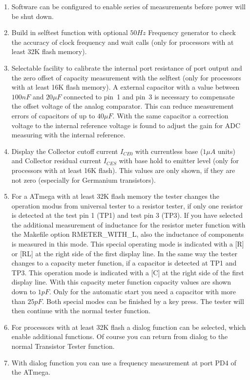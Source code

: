 \begin{enumerate}
\item Software can be configured to enable series of measurements before power will be shut down.
\item Build in selftest function with optional \(50Hz\) Frequency generator to check the accuracy of clock frequency and wait calls (only for processors with at least 32K flash memory).
\item Selectable facility to calibrate the internal port resistance of port output and
the zero offset of capacity measurement with the selftest (only for processors with at least 16K flash memory).
A external capacitor with a value between \(100nF\) 
and \(20\mu F\) connected to pin~1 and pin~3 is necessary to compensate the offset voltage of the analog comparator.
This can reduce measurement errors of capacitors of up to \(40\mu F\).
With the same capacitor a correction voltage to the internal reference voltage is found to adjust the
gain for ADC measuring with the internal reference.
\item Display the Collector cutoff current \(I_{CE0}\) with currentless base (\(1\mu A\) units) and
Collector residual current \(I_{CES}\) with base hold to emitter level (only for processors with at least 16K flash).
This values are only shown, if they are not zero (especially for Germanium transistors).
\item For a ATmega with at least 32K flash memory the tester changes the operation modus from universal tester
to a resistor tester, if only one resistor is detected at the test pin 1 (TP1) and test pin 3 (TP3).
If you have selected the additional measurement of inductance for the resistor meter function with the 
Makefile option RMETER\_WITH\_L, also the inductance of components is measured in this mode.
This special operating mode is indicated with a [R] or [RL] at the right side of the first display line.
In the same way the tester changes to a capacity meter function, if a capacitor is detected at TP1 and TP3.
This operation mode is indicated with a [C] at the right side of the first display line.
With this capacity meter function capacity values are shown down to \(1pF\). Only for the automatic
start you need a capacitor with more than \(25pF\).
Both special modes can be finished by a key press. 
The tester will then continue with the normal tester function.
\item For processors with at least 32K flash a dialog function can be selected, which enable additional functions.
Of course you can return from dialog to the normal Transistor Tester function.
\item With dialog function you can use a frequency measurement at port PD4 of the ATmega.

\end{enumerate}
